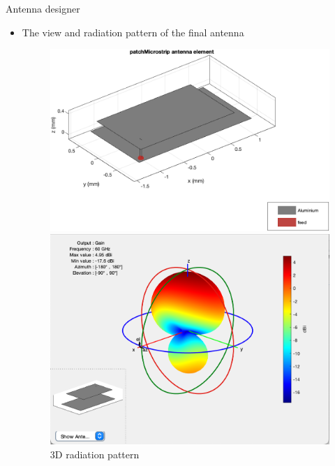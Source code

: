 \documentclass{beamer}
\begin{document}
\begin{frame}[t]{Antenna designer}
	\begin{itemize}
	    \item The view and radiation pattern of the final antenna
        \vspace{1.5\baselineskip}
            \begin{figure}
                \centering
                \begin{minipage}{0.45\textwidth}
                    \centering
                    \includegraphics[height=0.6\textwidth]{figures/antenna_plot_latest.png}
                    \caption{View of the final antenna}
                \end{minipage}
                \begin{minipage}{0.45\textwidth}
                    \centering
                    \includegraphics[height=0.6\textwidth]{figures/radiation_pattern_latest.png}
                    \caption{3D radiation pattern}
                \end{minipage}
            \end{figure}
	\end{itemize}
\end{frame}
\end{document}
